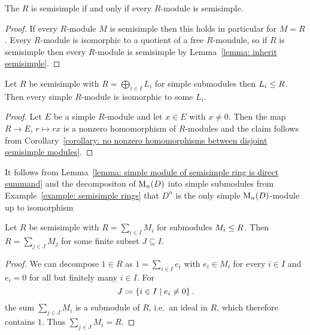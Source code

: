 \begin{proposition}
  The $R$ is semisimple if and only if every $R$-module is semisimple.
\end{proposition}


\begin{proof}
  If every $R$-module $M$ is semisimple then this holds in particular for $M = R$.
  Every $R$-module is isomorphic to a quotient of a free $R$-moudule, so if $R$ is semisimple then every $R$-module is semisimple by Lemma~\ref{lemma: inherit semisimple}.
\end{proof}


\begin{lemma}
  \label{lemma: simple module of semisimple ring is direct summand}
  Let $R$ be semisimple with $R = \bigoplus_{i \in I} L_i$ for simple submodules then $L_i \leq R$.
  Then every simple $R$-module is isomorphic to some $L_i$.
\end{lemma}




\begin{proof}
  Let $E$ be a simple $R$-module and let $x \in E$ with $x \neq 0$.
  Then the map $R \to E$, $r \mapsto rx$ is a nonzero homomorphism of $R$-modules and the claim follows from Corollary~\ref{corollary: no nonzero homomorphisms between disjoint semisimple modules}.
\end{proof}


\begin{example}
  \label{example: D^n is the only simple M_n(D)-module}
  It follows from Lemma~\ref{lemma: simple module of semisimple ring is direct summand} and the decompositon of $\operatorname{M}_n(D)$ into simple submodules from Example~\ref{example: semisimple rings} that $D^n$ is the only simple $\operatorname{M}_n(D)$-module up to isomorphism
\end{example}


\begin{lemma}
  \label{lemma: ring is already finite sum of submodules}
  Let $R$ be semisimple with $R = \sum_{i \in I} M_i$ for submodules $M_i \leq R$.
  Then $R = \sum_{j \in J} M_j$ for some finite subset $J \subseteq I$.
\end{lemma}


\begin{proof}
  We can decompose $1 \in R$ as $1 = \sum_{i \in I} e_i$ with $e_i \in M_i$ for every $i \in I$ and $e_i = 0$ for all but finitely many $i \in I$.
  For
  \[
              J
    \coloneqq  \{ i \in I \mid e_i \neq 0 \} \,.
  \]
  the sum $\sum_{j \in J} M_i$ is a submodule of $R$, i.e.\ an ideal in $R$, which therefore contains $1$.
  Thus $\sum_{j \in J} M_i = R$.
\end{proof}


